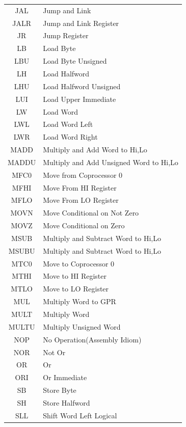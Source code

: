 \documentclass[blue,normal,cn,hide]{elegantbook}
\begin{document}
\begin{longtable}[c]{| c | l |}
    JAL & Jump and Link \\
    JALR & Jump and Link Register \\
    JR & Jump Register \\
    LB & Load Byte \\
    LBU & Load Byte Unsigned \\
    LH & Load Halfword \\
    LHU & Load Halfword Unsigned \\
    LUI & Load Upper Immediate \\
    LW & Load Word \\
    \rowcolor{green!20} LWL & Load Word Left \\
    \rowcolor{green!20} LWR & Load Word Right \\
    \rowcolor{green!20} MADD & Multiply and Add Word to Hi,Lo \\
    \rowcolor{green!20} MADDU & Multiply and Add Unsigned Word to Hi,Lo \\
    MFC0 & Move from Coprocessor 0 \\
    MFHI & Move From HI Register \\
    MFLO & Move From LO Register \\
    \rowcolor{green!20} MOVN & Move Conditional on Not Zero \\
    \rowcolor{green!20} MOVZ & Move Conditional on Zero \\
    \rowcolor{green!20} MSUB & Multiply and Subtract Word to Hi,Lo \\
    \rowcolor{green!20} MSUBU & Multiply and Subtract Word to Hi,Lo \\
    MTC0 & Move to Coprocessor 0 \\
    MTHI & Move to HI Register \\
    MTLO & Move to LO Register \\
    \rowcolor{green!20} MUL & Multiply Word to GPR \\
    MULT & Multiply Word \\
    MULTU & Multiply Unsigned Word \\
    NOP & No Operation(Assembly Idiom) \\
    NOR & Not Or \\
    OR & Or \\
    ORI & Or Immediate \\
    SB & Store Byte \\
    SH & Store Halfword \\
    SLL & Shift Word Left Logical \\

\end{longtable}
\end{document}

